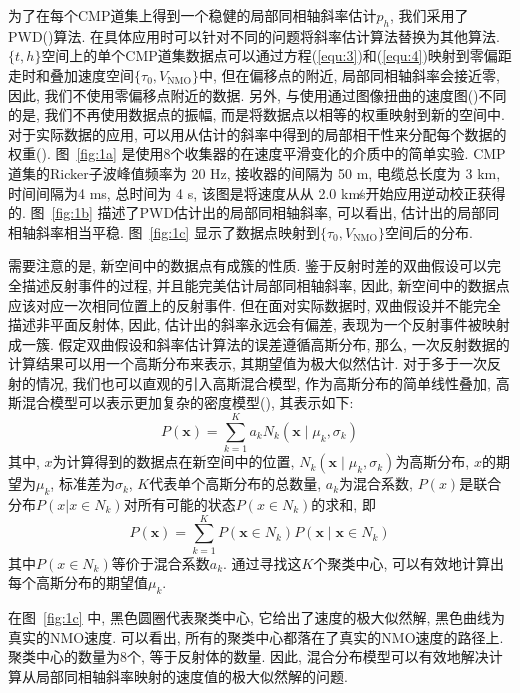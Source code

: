 为了在每个CMP道集上得到一个稳健的局部同相轴斜率估计$p_h$, 我们采用了PWD(\cite{Fomel2002, Chen2013})算法. 在具体应用时可以针对不同的问题将斜率估计算法替换为其他算法. $\{t,h\}$空间上的单个CMP道集数据点可以通过方程(\ref{equ:3})和(\ref{equ:4})映射到零偏距走时和叠加速度空间$\{\tau_0,V_{\mathrm{NMO}}\}$中, 但在偏移点的附近, 局部同相轴斜率会接近零, 因此, 我们不使用零偏移点附近的数据. 另外, 与使用通过图像扭曲的速度图(\cite{Fomel2007})不同的是, 我们不再使用数据点的振幅, 而是将数据点以相等的权重映射到新的空间中. 对于实际数据的应用, 可以用从估计的斜率中得到的局部相干性来分配每个数据的权重(\cite{Zhang2013}). 图~\ref{fig:1a} 是使用8个收集器的在速度平滑变化的介质中的简单实验. CMP道集的Ricker子波峰值频率为 20 Hz, 接收器的间隔为 50 m, 电缆总长度为 3 km, 时间间隔为4 ms, 总时间为 4 s, 该图是将速度从从 2.0 km∕s开始应用逆动校正获得的. 图~\ref{fig:1b} 描述了PWD估计出的局部同相轴斜率, 可以看出, 估计出的局部同相轴斜率相当平稳. 图~\ref{fig:1c} 显示了数据点映射到$\{\tau_0,V_{\mathrm{NMO}}\}$空间后的分布. 

需要注意的是, 新空间中的数据点有成簇的性质. 鉴于反射时差的双曲假设可以完全描述反射事件的过程, 并且能完美估计局部同相轴斜率, 因此, 新空间中的数据点应该对应一次相同位置上的反射事件. 但在面对实际数据时, 双曲假设并不能完全描述非平面反射体, 因此, 估计出的斜率永远会有偏差, 表现为一个反射事件被映射成一簇. 假定双曲假设和斜率估计算法的误差遵循高斯分布, 那么, 一次反射数据的计算结果可以用一个高斯分布来表示, 其期望值为极大似然估计. 对于多于一次反射的情况, 我们也可以直观的引入高斯混合模型, 作为高斯分布的简单线性叠加, 高斯混合模型可以表示更加复杂的密度模型(\cite{Bishop2006}), 其表示如下: 
\begin{equation}
    P(\mathbf{x})=\sum_{k=1}^{K} a_{k} N_{k}\left(\mathbf{x} \mid \mu_{k}, \sigma_{k}\right)
\end{equation}
其中, $x$为计算得到的数据点在新空间中的位置, $N_{k}\left(\mathbf{x} \mid \mu_{k}, \sigma_{k}\right)$为高斯分布, $x$的期望为$\mu_k$, 标准差为$\sigma_k$, $K$代表单个高斯分布的总数量, $a_k$为混合系数, $P(x)$是联合分布$P(x|x\in N_k)$对所有可能的状态$P(x\in N_k)$的求和, 即
\begin{equation}
    P(\mathbf{x})=\sum_{k=1}^{K} P\left(\mathbf{x} \in N_{k}\right) P\left(\mathbf{x} \mid \mathbf{x} \in N_{k}\right)
\end{equation}
其中$P(x\in N_k)$等价于混合系数$a_k$. 通过寻找这$K$个聚类中心, 可以有效地计算出每个高斯分布的期望值$\mu_k$. 

在图~\ref{fig:1c} 中, 黑色圆圈代表聚类中心, 它给出了速度的极大似然解, 黑色曲线为真实的NMO速度. 可以看出, 所有的聚类中心都落在了真实的NMO速度的路径上. 聚类中心的数量为8个, 等于反射体的数量. 因此, 混合分布模型可以有效地解决计算从局部同相轴斜率映射的速度值的极大似然解的问题. 

